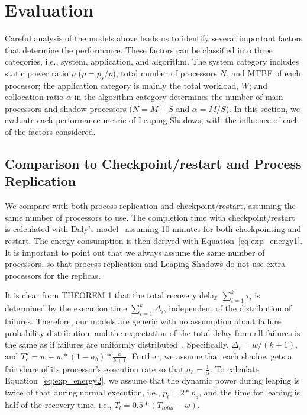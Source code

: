 \section{Evaluation}
Careful analysis of the models above leads us to identify several important factors that determine the performance. These factors can be classified into three categories, i.e., system, application, and algorithm. The system category includes static power ratio $\rho$ ($\rho=p_s/p$), total number of processors $N$, and MTBF of each processor; the application category is mainly the total workload, $W$; and collocation ratio $\alpha$ in the algorithm category determines the number of main processors and shadow processors ($N=M+S$ and $\alpha=M/S$). In this section, we evaluate each performance metric of Leaping Shadows,  with the influence of each of the factors considered. %


\subsection{Comparison to Checkpoint/restart and Process Replication}
\label{eval_comparison}
We compare with both process replication and checkpoint/restart, assuming the same number of processors to use. 
The completion time with checkpoint/restart is calculated with Daly's model~\cite{daly_fgcs_2006} assuming 10 minutes for both checkpointing and restart. The energy consumption is then derived with Equation~\ref{eq:exp_energy1}. It is important to point out that we always assume the same number of processors, so that process replication and Leaping Shadows do not use extra processors for the replicas. 

It is clear from THEOREM 1 that the total recovery delay $\sum_{i=1}^k\tau_i$ is determined by the execution time $\sum_{i=1}^k\Delta_i$, independent of the distribution of failures. 
Therefore, our models are generic with no assumption about failure probability distribution, and the expectation of the total delay from all failures is the same as if failures are uniformly distributed~\cite{daly_fgcs_2006}. Specifically, $\Delta_i = w/(k+1)$, and $T_c^k = w + w*(1-\sigma_b)*\frac{k}{k+1}$. Further, we assume that each shadow gets a fair share of its processor's execution rate so that $\sigma_b = \frac{1}{\alpha}$. 
To calculate Equation~\ref{eq:exp_energy2}, we assume that the dynamic power during leaping is twice of that during normal execution, i.e., $p_{l}=2*p_d$, and the time for leaping is half of the recovery time, i.e., $T_l=0.5*(T_{total} - w)$. 

